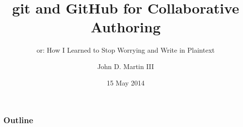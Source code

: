 \documentclass[t]{beamer}
\title{git and GitHub for Collaborative Authoring}
\subtitle{or: How I Learned to Stop Worrying and Write in Plaintext}
\author{John D. Martin III}
\institute{University of North Carolina at Chapel Hill}
\date{15 May 2014}
\begin{document}
\begin{frame}
\titlepage
\end{frame}

\begin{frame}
\frametitle{Outline}
\tableofcontents
\end{frame}


\end{document}
